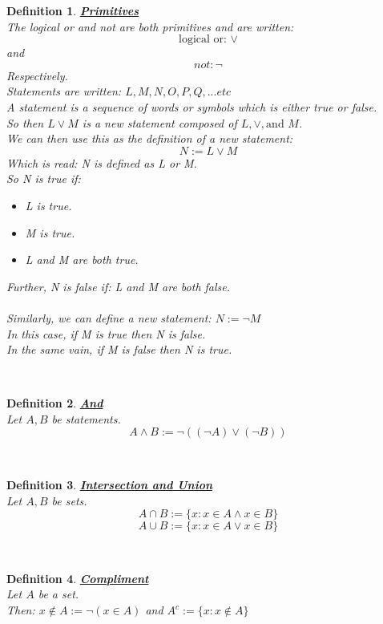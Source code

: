 \documentclass[12pt]{extarticle}
\theoremstyle{plain}
\theoremstyle{plain}
\theoremstyle{plain}
\theoremstyle{Definition}
\newtheorem{def.}{Definition}[section]
\theoremstyle{Definition}
\theoremstyle{plain}
\theoremstyle{plain}
\newcommand{\cut}[0]{\noindent\framebox[\linewidth]{\rule{\linewidth}{2pt}}\\}
\begin{document}
\begin{def.} \underline{\textbf{Primitives}} \\
	The logical or and not are both primitives and are written: \\ 
	$$\text{logical or: }\lor$$ 
	and 
	$$not: \lnot$$
	Respectively. \\
	Statements are written: $L,M,N,O,P,Q,... etc$ \\
	A statement is a sequence of words or symbols which is either true or false. \\
	So then $L \lor M$ is a new statement composed of $L,\lor,\text{and } M$. \\
	We can then use this as the definition of a new statement: \\ 
	$$N := L \lor M$$
	Which is read: N is defined as L or M. \\
	So N is true if: 
	\begin{itemize}
		\item 	L is true. 
		\item M is true.
		\item L and M are both true. 
	\end{itemize}
	Further, N is false if: 
	L and M are both false. \\ \\
	Similarly, we can define a new statement: $N := \lnot M$ \\ 
	In this case, if M is true then N is false. \\
	In the same vain, if M is false then N is true. 
\end{def.}
\cut
\begin{def.} \underline{\textbf{And}} \\
	Let $A,B$ be statements. \\ 
	$$A \land B := \lnot((\lnot A) \lor (\lnot B))$$ 
\end{def.}
\cut
\begin{def.} \underline{\textbf{Intersection and Union}} \\
	Let $A,B$ be sets. \\ 
	$$A \cap B := \{ x : x \in A \land x \in B\}$$
	$$A \cup B := \{ x : x \in A \lor x \in B\}$$
\end{def.}
\cut
\begin{def.} \underline{\textbf{Compliment}} \\ 
	Let $A$ be a set.  \\
	Then: $x \not \in A := \lnot(x \in A)$ and 
	$A^c := \{x : x \not \in A\}$
\end{def.}
\cut
\end{document}
